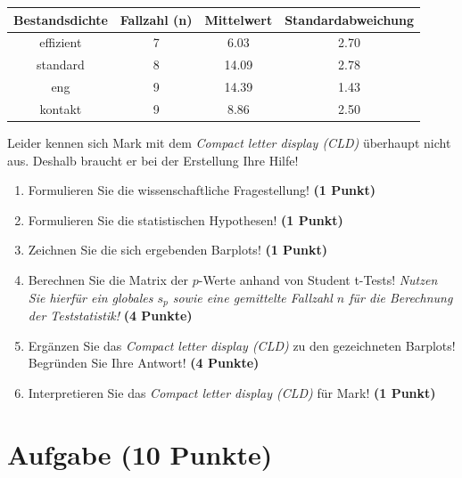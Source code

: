 \documentclass[a4paper, 9pt]{scrartcl}\usepackage[]{graphicx}\usepackage[]{xcolor}
\newenvironment{knitrout}{}{} %
\begin{document}
\begin{knitrout}
\color{fgcolor}\begin{table}[!h]
\centering\begingroup\fontsize{10}{12}\selectfont

\begin{tabular}{cccc}
\toprule
\textbf{Bestandsdichte} & \textbf{Fallzahl (n)} & \textbf{Mittelwert} & \textbf{Standardabweichung}\\
\midrule
effizient & 7 & 6.03 & 2.70\\
standard & 8 & 14.09 & 2.78\\
eng & 9 & 14.39 & 1.43\\
kontakt & 9 & 8.86 & 2.50\\
\bottomrule
\end{tabular}
\endgroup{}
\end{table}

\end{knitrout}

Leider kennen sich Mark mit dem \textit{Compact letter display (CLD)} überhaupt nicht aus. Deshalb braucht er bei der Erstellung Ihre Hilfe!

\begin{enumerate}
  \item Formulieren Sie die wissenschaftliche Fragestellung! \textbf{(1 Punkt)}
  \item Formulieren Sie die statistischen Hypothesen! \textbf{(1 Punkt)}
\item Zeichnen Sie die sich ergebenden Barplots! \textbf{(1 Punkt)}
\item Berechnen Sie die Matrix der $p$-Werte anhand von Student t-Tests! \textit{Nutzen Sie hierfür ein globales $s_p$ sowie eine gemittelte Fallzahl $n$ für die Berechnung der Teststatistik!} \textbf{(4 Punkte)}
\item Ergänzen Sie das \textit{Compact letter display (CLD)} zu den gezeichneten Barplots! Begründen Sie Ihre Antwort! \textbf{(4 Punkte)}
\item Interpretieren Sie das \textit{Compact letter display (CLD)} für Mark! \textbf{(1 Punkt)} 
\end{enumerate}

 
\clearpage

\section{Aufgabe \hfill (10 Punkte)}
\end{document}
